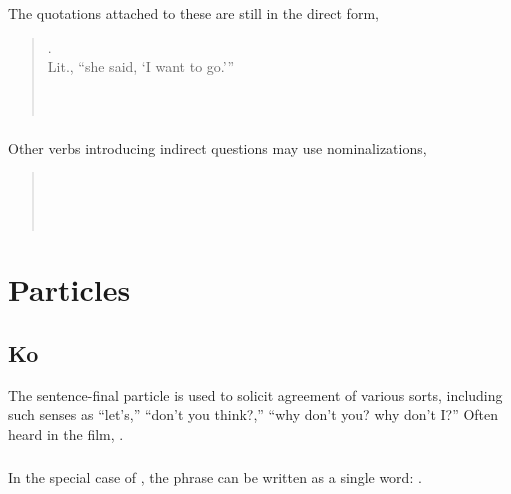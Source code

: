 \noindent The quotations attached to these are still in the direct
form,

\begin{quotation}
\noindent{} .\\
\indent Lit., ``she said, `I want to go.'''\\
\noindent{}
 \\
\noindent{} \\
\indent{}
\end{quotation}
\label{syn:quot:nominalized}

\subsubsection{} Other verbs introducing indirect questions may use
 nominalizations,

\begin{quotation}
\noindent{}\\
\indent{} \\
\noindent{} \\
\indent{}
\end{quotation}


\section{Particles}

\subsection{Ko} The sentence-final particle  is used to solicit
agreement of various sorts, including such senses as ``let's,''
``don't you think?,'' ``why don't you? why don't I?''  Often heard in
the film,  .
\label{syn:particle:ko}

\subsubsection{} In the special case of  , 
the phrase can be written as a single word: .

